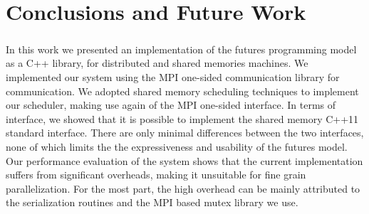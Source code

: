 \chapter{Conclusions and Future Work}
\label{chap:conclusion}
\paragraph{}
In this work we presented an implementation of the futures programming model as a C++ library,
for distributed and shared memories machines.  We implemented our system using the MPI one-sided communication
library for communication. We adopted shared memory scheduling techniques to implement 
our scheduler, making use again of the MPI one-sided interface.  In terms of interface, we showed that it 
is possible to implement the shared memory C++11 standard interface.  There are only minimal differences
between the two interfaces, none of which limits the the expressiveness and usability of the futures model. 
Our performance evaluation of the system shows
that the current implementation suffers from significant overheads, making it unsuitable for fine grain
parallelization.  For the most part, the high overhead can be mainly attributed to the serialization 
routines and the MPI based mutex library we use.  

